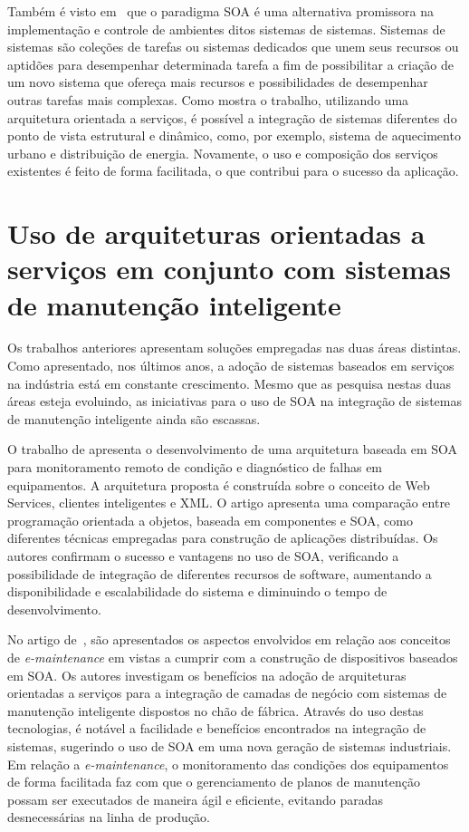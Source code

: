 Também é visto em~\cite{nagorny2013engineering} que o paradigma \gls{SOA} é uma alternativa
promissora na implementação e controle de ambientes ditos sistemas de sistemas. Sistemas de sistemas
são coleções de tarefas ou sistemas dedicados que unem seus recursos ou aptidões para desempenhar
determinada tarefa a fim de possibilitar a criação de um novo sistema que ofereça mais recursos e
possibilidades de desempenhar outras tarefas mais complexas. Como mostra o trabalho, utilizando uma
arquitetura orientada a serviços, é possível a integração de sistemas diferentes do ponto de vista
estrutural e dinâmico, como, por exemplo, sistema de aquecimento urbano e distribuição de energia.
Novamente, o uso e composição dos serviços existentes é feito de forma facilitada, o que contribui
para o sucesso da aplicação.


\section{Uso de arquiteturas orientadas a serviços em conjunto com sistemas de manutenção
inteligente}

Os trabalhos anteriores apresentam soluções empregadas nas duas áreas distintas. Como apresentado,
nos últimos anos, a adoção de sistemas baseados em serviços na indústria está em constante
crescimento. Mesmo que as pesquisa nestas duas áreas esteja evoluindo, as iniciativas para o uso de
\gls{SOA} na integração de sistemas de manutenção inteligente ainda são escassas.

O trabalho de \cite{zhao2010soabased} apresenta o desenvolvimento de uma arquitetura baseada em
\gls{SOA} para monitoramento remoto de condição e diagnóstico de falhas em equipamentos. A
arquitetura proposta é construída sobre o conceito de Web Services, clientes inteligentes e
\gls{XML}. O artigo apresenta uma comparação entre programação orientada a objetos, baseada em
componentes e \gls{SOA}, como diferentes técnicas empregadas para construção de aplicações
distribuídas. Os autores confirmam o sucesso e vantagens no uso de \gls{SOA}, verificando a
possibilidade de integração de diferentes recursos de software, aumentando a disponibilidade e
escalabilidade do sistema e diminuindo o tempo de desenvolvimento.

No artigo de~\cite{cannata2010dynamic}, são apresentados os aspectos envolvidos em relação aos
conceitos de \textit{e-maintenance} em vistas a cumprir com a construção de dispositivos baseados em
\gls{SOA}. Os autores investigam os benefícios na adoção de arquiteturas orientadas a serviços para
a integração de camadas de negócio com sistemas de manutenção inteligente dispostos no chão de
fábrica. Através do uso destas tecnologias, é notável a facilidade e benefícios encontrados na
integração de sistemas, sugerindo o uso de \gls{SOA} em uma nova geração de sistemas industriais. Em
relação a \textit{e-maintenance}, o monitoramento das condições dos equipamentos de forma facilitada
faz com que o gerenciamento de planos de manutenção possam ser executados de maneira ágil e
eficiente, evitando paradas desnecessárias na linha de produção.
